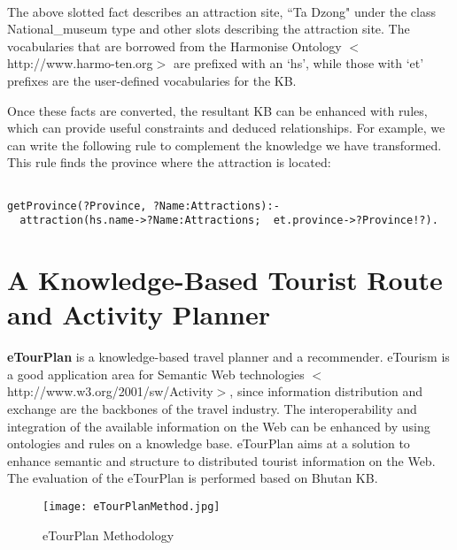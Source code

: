 \documentclass [letterpaper] {Article}
\begin{document}
\begin{small}
\begin{small}
\begin{verbatim}
           
\end{verbatim}
\end{small}

\hspace{0.3in}The above slotted fact describes an attraction site, ``Ta Dzong" under the class National\_museum type and other slots describing the attraction site. The vocabularies that are borrowed from the Harmonise Ontology \linebreak 
$<$http://www.harmo-ten.org$>$ are prefixed with an `hs', while those with `et' prefixes are the user-defined vocabularies for the KB. 

\hspace{0.3in}Once these facts are converted, the resultant KB can be enhanced with rules, which can provide useful constraints and deduced relationships. For example, we can write the following rule to complement the knowledge we have transformed. This rule finds the province where the attraction is located:

\begin{small}
\begin{verbatim}           

getProvince(?Province, ?Name:Attractions):-
  attraction(hs.name->?Name:Attractions;  et.province->?Province!?).

 \end{verbatim}
\end{small}	   

\section{A Knowledge-Based Tourist Route and Activity Planner}

\hspace{0.3in}\textbf{eTourPlan} is a knowledge-based travel planner and a recommender. eTourism is a good application area for Semantic Web technologies \linebreak$<$http://www.w3.org/2001/sw/Activity$>$, since information distribution and exchange are the backbones of the travel industry. The interoperability and integration of the available information on the Web can be enhanced by using ontologies and rules on a knowledge base. eTourPlan aims at a solution to enhance semantic and structure to distributed tourist information on the Web. The evaluation of the eTourPlan is performed based on Bhutan KB.

\begin{figure}
\begin{center}
\texttt{[image: eTourPlanMethod.jpg]}
\caption {eTourPlan Methodology}
\label{fig:3Fig1} 
\end{center}
\end{figure}


\end{small}
\end{document}

